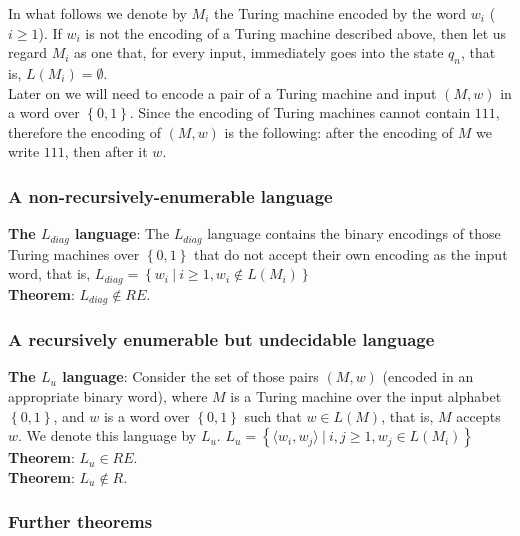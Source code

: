 \documentclass[margin=0px]{article}
\begin{document}
In what follows we denote by $M_{i}$ the Turing machine encoded by the word $w_{i}$ ($i \geq 1$). If
$w_{i}$ is not the encoding of a Turing machine described above, then let us regard $M_{i}$ as one that, for every input,
immediately goes into the state $q_{n}$, that is, $L(M_{i}) = \emptyset$.\\

Later on we will need to encode a pair of a Turing machine and input $(M, w)$ in a word
over $\left\{0, 1\right\}$. Since the encoding of Turing machines cannot contain
$111$, therefore the encoding of $(M, w)$ is the following: after the encoding of $M$ we write $111$, then after it $w$.

\subsubsection{A non-recursively-enumerable language}

\noindent \textbf{The $L_{diag}$ language}: The $L_{diag}$ language contains the binary encodings of those Turing machines
over $\left\{0, 1\right\}$ that do not accept their own encoding as the input word, that is,
$L_{diag} = \left\{w_{i} \ | \ i \geq 1, w_{i} \notin L(M_{i}) \right\}$\\

\noindent \textbf{Theorem}: $L_{diag} \notin RE$.

\subsubsection{A recursively enumerable but undecidable language}

\noindent \textbf{The $L_{u}$ language}: Consider the set of those pairs $(M, w)$ (encoded in an appropriate binary word),
where $M$ is a Turing machine over the input alphabet $\left\{0, 1\right\}$, and $w$ is a word over $\left\{0, 1\right\}$
such that $w \in L(M)$, that is, $M$ accepts $w$. We denote this language by $L_{u}$.
$L_{u} = \left\{\langle w_{i},w_{j} \rangle \ | \ i, j \geq 1, w_{j} \in L(M_{i}) \right\}$\\

\noindent \textbf{Theorem}: $L_{u} \in RE$.\\

\noindent \textbf{Theorem}: $L_{u} \notin R$.

\subsubsection{Further theorems}
\end{document}

